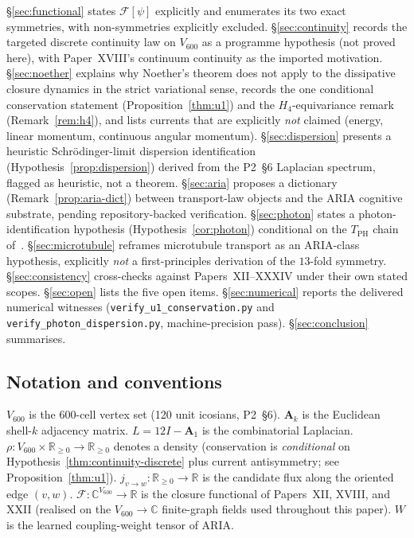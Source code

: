 \documentclass[11pt]{article}
\theoremstyle{definition}
\newcommand{\R}{\mathbb{R}}
\newcommand{\C}{\mathbb{C}}
\newcommand{\Fcal}{\mathcal{F}}
\begin{document}
\S\ref{sec:functional} states $\Fcal[\psi]$ explicitly and enumerates its two exact symmetries, with non-symmetries explicitly excluded.
\S\ref{sec:continuity} records the targeted discrete continuity law on $V_{600}$ as a programme hypothesis (not proved here), with Paper~XVIII's continuum continuity as the imported motivation.
\S\ref{sec:noether} explains why Noether's theorem does not apply to the dissipative closure dynamics in the strict variational sense, records the one conditional conservation statement (Proposition~\ref{thm:u1}) and the $H_4$-equivariance remark (Remark~\ref{rem:h4}), and lists currents that are explicitly \emph{not} claimed (energy, linear momentum, continuous angular momentum).
\S\ref{sec:dispersion} presents a heuristic Schr\"{o}dinger-limit dispersion identification (Hypothesis~\ref{prop:dispersion}) derived from the P2~\S 6 Laplacian spectrum, flagged as heuristic, not a theorem.
\S\ref{sec:aria} proposes a dictionary (Remark~\ref{prop:aria-dict}) between transport-law objects and the ARIA cognitive substrate, pending repository-backed verification.
\S\ref{sec:photon} states a photon-identification hypothesis (Hypothesis~\ref{cor:photon}) conditional on the $T_{\text{PH}}$ chain of~\citep{CascadeAlphaChain}.
\S\ref{sec:microtubule} reframes microtubule transport as an ARIA-class hypothesis, explicitly \emph{not} a first-principles derivation of the $13$-fold symmetry.
\S\ref{sec:consistency} cross-checks against Papers~XII--XXXIV under their own stated scopes.
\S\ref{sec:open} lists the five open items.
\S\ref{sec:numerical} reports the delivered numerical witnesses (\texttt{verify\_u1\_conservation.py} and \texttt{verify\_photon\_dispersion.py}, machine-precision pass).
\S\ref{sec:conclusion} summarises.

\subsection{Notation and conventions}

$V_{600}$ is the 600-cell vertex set (120 unit icosians, P2~\S 6).
$\mathbf{A}_k$ is the Euclidean shell-$k$ adjacency matrix.
$L = 12I - \mathbf{A}_1$ is the combinatorial Laplacian.
$\rho: V_{600} \times \R_{\geq 0} \to \R_{\geq 0}$ denotes a density (conservation is \emph{conditional} on Hypothesis~\ref{thm:continuity-discrete} plus current antisymmetry; see Proposition~\ref{thm:u1}).
$j_{v \to w}: \R_{\geq 0} \to \R$ is the candidate flux along the oriented edge $(v, w)$.
$\Fcal: \C^{V_{600}} \to \R$ is the closure functional of Papers~XII, XVIII, and XXII (realised on the $V_{600} \to \C$ finite-graph fields used throughout this paper).
$W$ is the learned coupling-weight tensor of ARIA.
\end{document}
